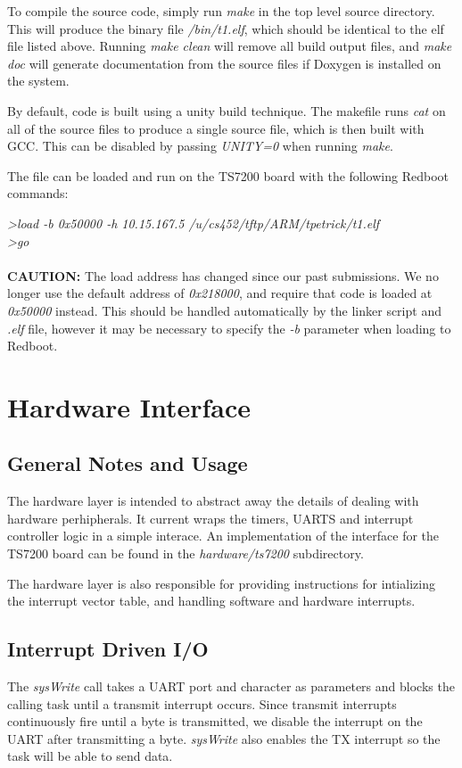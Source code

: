 \documentclass[twoside,a4paper]{refart}
\begin{document}
To compile the source code, simply run \textit{make} in the top level source directory. This will produce the binary file \textit{/bin/t1.elf}, which should be identical to the elf file listed above. Running \textit{make clean} will remove all build output files, and \textit{make doc} will generate documentation from the source files if Doxygen is installed on the system.

By default, code is built using a unity build technique. The makefile runs \textit{cat} on all of the source files to produce a single source file, which is then built with GCC. This can be disabled by passing \textit{UNITY=0} when running \textit{make}.

The file can be loaded and run on the TS7200 board with the following Redboot commands:

\textit{\textgreater load -b 0x50000 -h 10.15.167.5 /u/cs452/tftp/ARM/tpetrick/t1.elf}\\
\textit{\textgreater go}\\\\

\textbf{CAUTION:}  The load address has changed since our past submissions. We no longer use the default address of \textit{0x218000}, and require that code is loaded at \textit{0x50000} instead. This should be handled automatically by the linker script and \textit{.elf} file, however it may be necessary to specify the \textit{-b} parameter when loading to Redboot.

\section{Hardware Interface}
\subsection{General Notes and Usage}
The hardware layer is intended to abstract away the details of dealing with hardware perhipherals. It current wraps the timers, UARTS and interrupt controller logic in a simple interace. An implementation of the interface for the TS7200 board can be found in the \textit{hardware/ts7200} subdirectory.

The hardware layer is also responsible for providing instructions for intializing the interrupt vector table, and handling software and hardware interrupts.

\subsection{Interrupt Driven I/O}
The \textit{sysWrite} call takes a UART port and character as parameters and blocks the calling task until a transmit interrupt occurs. Since transmit interrupts continuously fire until a byte is transmitted, we disable the interrupt on the UART after transmitting a byte. \textit{sysWrite} also enables the TX interrupt so the task will be able to send data.
\end{document}
